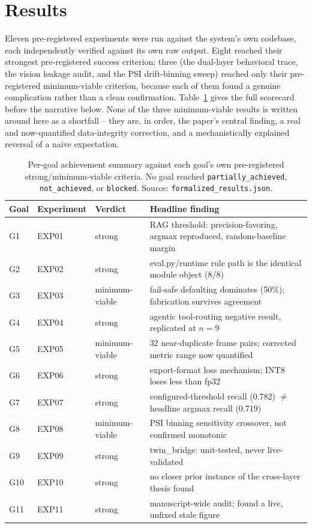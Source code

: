 \section{Results}
\label{sec:results}

Eleven pre-registered experiments were run against the system's own codebase, each independently
verified against its own raw output. Eight reached their strongest pre-registered success
criterion; three (the dual-layer behavioral trace, the vision leakage audit, and the PSI
drift-binning sweep) reached only their pre-registered minimum-viable criterion, because each of
them found a genuine complication rather than a clean confirmation. Table~\ref{tab:goal-summary}
gives the full scorecard before the narrative below. None of the three minimum-viable results is
written around here as a shortfall -- they are, in order, the paper's central finding, a real and
now-quantified data-integrity correction, and a mechanistically explained reversal of a naive
expectation.

\begin{table}[t]
\centering
\small
\caption{Per-goal achievement summary against each goal's own pre-registered strong/minimum-viable
criteria. No goal reached \texttt{partially\_achieved}, \texttt{not\_achieved}, or \texttt{blocked}.
Source: \texttt{formalized\_results.json}.}
\label{tab:goal-summary}
\begin{tabular}{@{}lllp{7.6cm}@{}}
\toprule
Goal & Experiment & Verdict & Headline finding \\
\midrule
G1 & EXP01 & strong & RAG threshold: precision-favoring, argmax reproduced, random-baseline margin \\
G2 & EXP02 & strong & eval.py/runtime rule path is the identical module object (8/8) \\
G3 & EXP03 & minimum-viable & fail-safe defaulting dominates (50\%); fabrication survives agreement \\
G4 & EXP04 & strong & agentic tool-routing negative result, replicated at $n{=}9$ \\
G5 & EXP05 & minimum-viable & 32 near-duplicate frame pairs; corrected metric range now quantified \\
G6 & EXP06 & strong & export-format loss mechanism; INT8 loses less than fp32 \\
G7 & EXP07 & strong & configured-threshold recall (0.782) $\ne$ headline argmax recall (0.719) \\
G8 & EXP08 & minimum-viable & PSI binning sensitivity crossover, not confirmed monotonic \\
G9 & EXP09 & strong & twin\_bridge: unit-tested, never live-validated \\
G10 & EXP10 & strong & no closer prior instance of the cross-layer thesis found \\
G11 & EXP11 & strong & manuscript-wide audit; found a live, unfixed stale figure \\
\bottomrule
\end{tabular}
\end{table}

